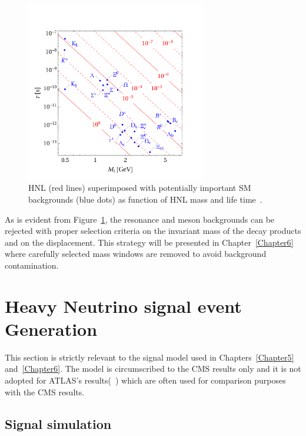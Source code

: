 \begin{figure}[h!]
\centering
 \includegraphics[clip,trim=0.5cm 0.5cm 2cm 2cm, width=0.7\textwidth]{Figures/c4/resonances.pdf}
  \caption{HNL \mixpar (red lines) superimposed with potentially important SM backgrounds
(blue dots) as function of HNL mass and life time~\cite{Drewes_2020_jan}.}
  \label{fig:c4LLbgk}
\end{figure}

As is evident from Figure~\ref{fig:c4LLbgk}, the resonance and
meson backgrounds can be rejected with proper selection criteria on
the invariant mass of the decay products and on
the displacement. This strategy will be presented in
Chapter~\ref{Chapter6} where carefully selected mass windows are removed
to avoid background contamination.




\clearpage
\section{Heavy Neutrino signal event Generation}\label{sec:c4hnl}
This section is strictly relevant to the signal model used in
Chapters~\ref{Chapter5} and~\ref{Chapter6}. The model is circumscribed to the
CMS results only and it is not adopted for ATLAS's
results(~\cite{atlasintro2}) which are often used for comparison
purposes with the CMS results.



\subsection{Signal simulation}\label{sec:c4hnlmodel}

